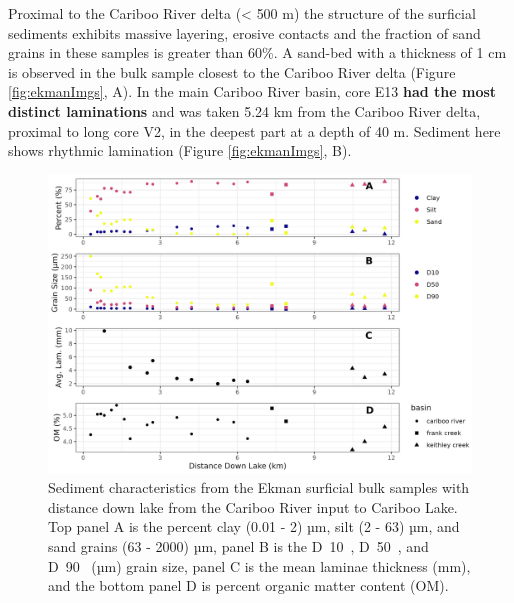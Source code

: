 \documentclass[Royal,times,doublespace,sageh]{sagej}
\begin{document}
Proximal to the Cariboo River delta (\textless{} 500 m) the structure of
the surficial sediments exhibits massive layering, erosive contacts and
the fraction of sand grains in these samples is greater than 60\%. A
sand-bed with a thickness of 1 cm is observed in the bulk sample closest
to the Cariboo River delta (Figure \ref{fig:ekmanImgs}, A). In the main
Cariboo River basin, core E13 \textbf{had the most distinct laminations}
and was taken 5.24 km from the Cariboo River delta, proximal to long
core V2, in the deepest part at a depth of 40 m. Sediment here shows
rhythmic lamination (Figure \ref{fig:ekmanImgs}, B).

\begin{figure}

{\centering \includegraphics[width=1\linewidth]{figs/ekman_seds} 

}

\caption{Sediment characteristics from the Ekman surficial bulk samples with distance down lake from the Cariboo River input to Cariboo Lake. Top panel A is the percent clay (0.01 - 2) µm, silt (2 - 63) µm, and sand grains (63 - 2000) µm, panel B is the  D~10~, D~50~, and D~90~ (µm) grain size, panel C is the mean laminae thickness (mm), and the bottom panel D is percent organic matter content (OM).}\label{fig:ekmanSeds}
\end{figure}
\end{document}
